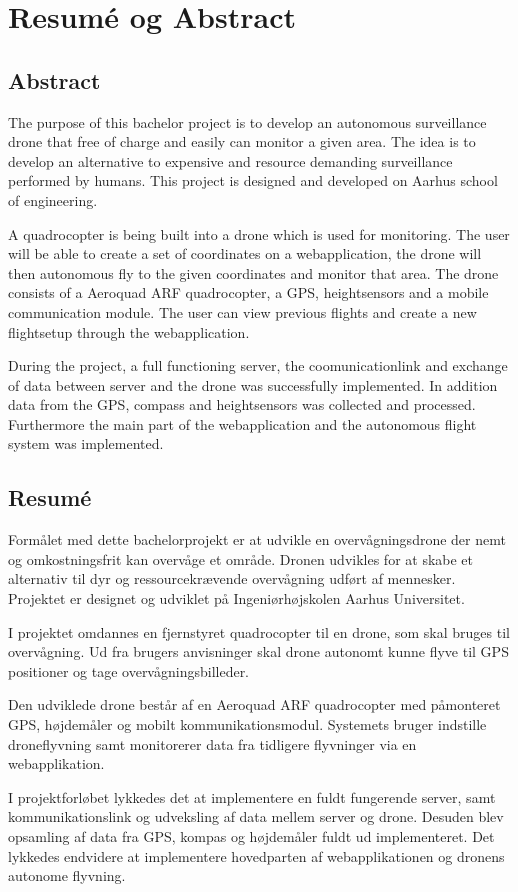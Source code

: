 \chapter{Resumé og Abstract}
\label{chap:resume}


\section*{Abstract}


The purpose of this bachelor project is to develop an autonomous surveillance drone that free of charge and easily can monitor a given area. The idea is to develop an alternative to expensive and resource demanding surveillance performed by humans. This project is designed and developed on Aarhus school of engineering. 

A quadrocopter is being built into a drone which is used for monitoring. The user will be able to create a set of coordinates on a webapplication, the drone will then autonomous fly to the given coordinates and monitor that area. 
The drone consists of a Aeroquad ARF quadrocopter, a GPS, heightsensors and a mobile communication module. 
The user can view previous flights and create a new flightsetup through the webapplication.

During the project, a full functioning server, the coomunicationlink and exchange of data between server and the drone was successfully implemented. In addition data from the GPS, compass and heightsensors was collected and processed. Furthermore the main part of the webapplication and the autonomous flight system was implemented.




\section*{Resumé}

Formålet med dette bachelorprojekt er at udvikle en overvågningsdrone der nemt og omkostningsfrit kan overvåge et område. Dronen udvikles for at skabe et alternativ til dyr og ressourcekrævende overvågning udført af mennesker.
Projektet er designet og udviklet på Ingeniørhøjskolen Aarhus Universitet.

I projektet omdannes en fjernstyret quadrocopter til en drone, som skal bruges til overvågning. Ud fra brugers anvisninger skal drone autonomt kunne flyve til GPS positioner og tage overvågningsbilleder.  

Den udviklede drone består af en Aeroquad ARF quadrocopter med påmonteret GPS, højdemåler og mobilt kommunikationsmodul. Systemets bruger indstille droneflyvning samt monitorerer data fra tidligere flyvninger via en webapplikation.  

I projektforløbet lykkedes det at implementere en fuldt fungerende server, samt kommunikationslink og udveksling af data mellem server og drone. Desuden blev opsamling af data fra GPS, kompas og højdemåler fuldt ud implementeret. Det lykkedes endvidere at implementere hovedparten af webapplikationen og dronens autonome flyvning.





